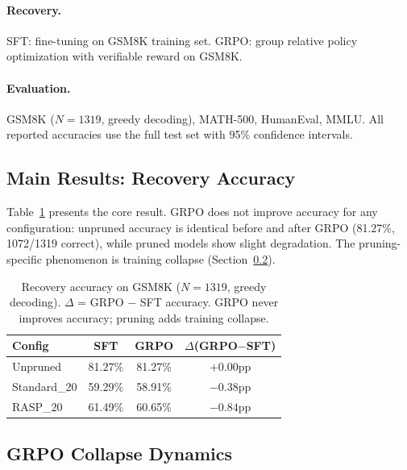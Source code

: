 \documentclass[11pt]{article}
\begin{document}
\paragraph{Recovery.}
SFT: fine-tuning on GSM8K training set.
GRPO: group relative policy optimization with verifiable reward on GSM8K.

\paragraph{Evaluation.}
GSM8K ($N{=}1319$, greedy decoding), MATH-500, HumanEval, MMLU.
All reported accuracies use the full test set with 95\% confidence intervals.

\subsection{Main Results: Recovery Accuracy}
\label{sec:main_results}

Table~\ref{tab:main_recovery} presents the core result.
GRPO does not improve accuracy for any configuration: unpruned accuracy is identical before and after GRPO (81.27\%, 1072/1319 correct), while pruned models show slight degradation.
The pruning-specific phenomenon is training collapse (Section~\ref{sec:collapse}).

\begin{table}[t]
\centering
\caption{Recovery accuracy on GSM8K ($N{=}1319$, greedy decoding). $\Delta$ = GRPO $-$ SFT accuracy. GRPO never improves accuracy; pruning adds training collapse.}
\label{tab:main_recovery}
\begin{tabular}{lccc}
\toprule
\textbf{Config} & \textbf{SFT} & \textbf{GRPO} & \textbf{$\Delta$(GRPO$-$SFT)} \\
\midrule
Unpruned     & 81.27\% & 81.27\% & $+0.00$pp \\
Standard\_20 & 59.29\% & 58.91\% & $-0.38$pp \\
RASP\_20     & 61.49\% & 60.65\% & $-0.84$pp \\
\bottomrule
\end{tabular}
\end{table}

\subsection{GRPO Collapse Dynamics}
\label{sec:collapse}
\end{document}
